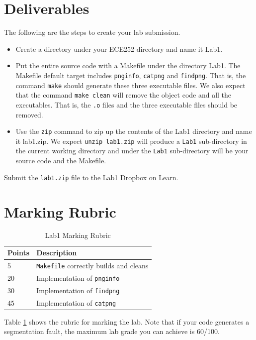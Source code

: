 \section{Deliverables}
The following are the steps to create your lab submission.
\begin{itemize}
\item Create a directory under your ECE252 directory and name it Lab1.
\item Put the entire source code with a Makefile under the directory Lab1. The Makefile default target includes \verb+pnginfo+, \verb+catpng+ and \verb+findpng+. That is, the command \verb+make+ should generate these three executable files. We also expect that the command \verb+make clean+ will remove the object code and all the executables. That is, the \verb+.o+ files and the three executable files should be removed.
\item Use the \verb+zip+ command to zip up the contents of the Lab1 directory and name it lab1.zip. We expect \verb+unzip lab1.zip+ will produce a \verb+Lab1+ sub-directory in the current working directory and under the \verb+Lab1+ sub-directory will be your source code and the Makefile.
\end{itemize}
Submit the \verb+lab1.zip+ file to the Lab1 Dropbox on Learn.
\section{Marking Rubric}
\begin{table}[ht]
\begin{center}
\begin{tabular}{|p{2cm}|p{9cm}|}
\hline
Points &Description  \\ \hline
5 	& \verb+Makefile+ correctly builds and cleans \\ \hline
20	& Implementation of \verb+pnginfo+ \\ \hline
30    & Implementation of \verb+findpng+  \\ \hline
45    & Implementation of \verb+catpng+ \\ \hline
\end{tabular}
\caption{Lab1 Marking Rubric}
\label{tb_lab1_rubric}
\end{center}
\end{table}

Table \ref{tb_lab1_rubric} shows the rubric for marking the lab. Note that if your code generates a segmentation fault, the maximum lab grade you can achieve is 60/100.

